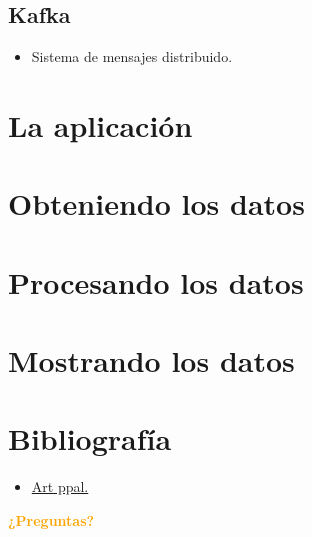 \documentclass{beamer}
\begin{document}
	\subsection{Kafka}
	
	\begin{frame}
		\begin{itemize}
			\item Sistema de mensajes distribuido.
		\end{itemize}
	\end{frame}
	
	\section{La aplicación}
	
	\section{Obteniendo los datos}
	
	\section{Procesando los datos}
	
	\section{Mostrando los datos}
	
	\section{Bibliografía}
	
	\begin{frame}
		\begin{itemize}
		\item \href{https://www.infoq.com/articles/traffic-data-monitoring-iot-kafka-and-spark-streaming}{Art ppal.}
		\end{itemize}
	\end{frame}
	
	\begin{frame}[plain]
		\begin{center}
			\textcolor{orange}{\textbf{¿Preguntas?}}
		\end{center}
	\end{frame}
	
	
\end{document}
